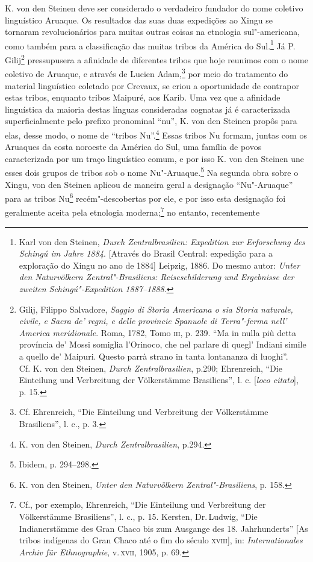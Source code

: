 K. von den Steinen deve ser considerado o verdadeiro fundador do nome
coletivo linguístico Aruaque. Os resultados das suas duas expedições ao
Xingu se tornaram revolucionários para muitas outras coisas na etnologia
sul"-americana, como também para a classificação das muitas tribos da
América do Sul.\footnote{Karl von den Steinen, \emph{Durch
  Zentralbrasilien: Expedition zur Erforschung des Schingú im Jahre
  1884}. {[}Através do Brasil Central: expedição para a exploração do
  Xingu no ano de 1884{]} Leipzig, 1886. Do mesmo autor: \emph{Unter den
  Naturvölkern Zentral"-Brasiliens: Reiseschilderung und Ergebnisse der
  zweiten Schingú"-Expedition 1887--1888}.} Já P. Gilij\footnote{Gilij,
  Filippo Salvadore, \emph{Saggio di Storia Americana o sia Storia
  naturale, civile, e Sacra de' regni, e delle provincie Spanuole di
  Terra"-ferma nell' America meridionale}. Roma, 1782, Tomo \textsc{iii}, p. 239.
  ``Ma in nulla più detta província de' Mossi somiglia l'Orinoco, che
  nel parlare di quegl' Indiani simile a quello de' Maipuri. Questo
  parrà strano in tanta lontananza di luoghi''.\\
  Cf. K. von den Steinen, \emph{Durch Zentralbrasilien}, p.290;
  Ehrenreich, ``Die Einteilung und Verbreitung der Völkerstämme
  Brasiliens'', l. c. {[}\emph{loco citato}{]}, p. 15.} pressupusera a afinidade de diferentes tribos que hoje
reunimos com o nome coletivo de Aruaque, e através de Lucien
Adam,\footnote{Cf. Ehrenreich, ``Die Einteilung und Verbreitung der
  Völkerstämme Brasiliens'', l. c., p. 3.} por meio do tratamento do
material linguístico coletado por Crevaux, se criou a oportunidade de
contrapor estas tribos, enquanto tribos Maipuré, aos Karib. Uma vez que
a afinidade linguística da maioria destas línguas consideradas cognatas
já é caracterizada superficialmente pelo prefixo pronominal ``nu'', K.
von den Steinen propôs para elas, desse modo, o nome de ``tribos
Nu''.\footnote{K. von den Steinen, \emph{Durch Zentralbrasilien}, p.294.}
Essas tribos Nu formam, juntas com os Aruaques da costa noroeste da
América do Sul, uma família de povos caracterizada por um traço
linguístico comum, e por isso K. von den Steinen une esses dois grupos
de tribos sob o nome Nu"-Aruaque.\footnote{Ibidem, p. 294--298.} Na
segunda obra sobre o Xingu, von den Steinen aplicou de maneira geral a
designação ``Nu"-Aruaque'' para as tribos Nu\footnote{K. von den
  Steinen, \emph{Unter den Naturvölkern Zentral"-Brasiliens}, p. 158.}
recém"-descobertas por ele, e por isso esta designação foi geralmente
aceita pela etnologia moderna;\footnote{Cf., por exemplo, Ehrenreich,
  ``Die Einteilung und Verbreitung der Völkerstämme Brasiliens'', l.
  c., p. 15. Kersten, Dr.\,Ludwig, ``Die Indianerstämme des Gran Chaco
  bis zum Ausgange des 18. Jahrhunderts'' {[}As tribos indígenas do Gran
  Chaco até o fim do século \textsc{xviii}{]}, in: \emph{Internationales Archiv
  für Ethnographie}, v.\,\textsc{xvii}, 1905, p. 69.} no entanto, recentemente
